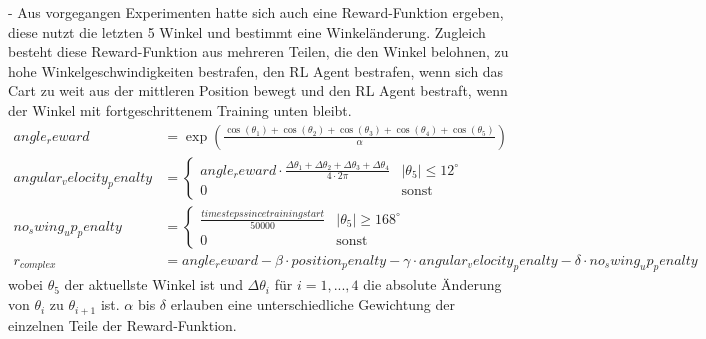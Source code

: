 - Aus vorgegangen Experimenten hatte sich auch eine Reward-Funktion ergeben, diese nutzt die letzten 5 Winkel und bestimmt eine Winkeländerung. Zugleich besteht diese Reward-Funktion aus mehreren Teilen, die den Winkel belohnen, zu hohe Winkelgeschwindigkeiten bestrafen, den RL Agent bestrafen, wenn sich das Cart zu weit aus der mittleren Position bewegt und den RL Agent bestraft, wenn der Winkel mit fortgeschrittenem Training unten bleibt. \begin{align}
    angle_reward &= \exp\left(\frac{\cos(\theta_1) + \cos(\theta_2) + \cos(\theta_3) + \cos(\theta_4) + \cos(\theta_5)}{\alpha}\right) \\
    angular_velocity_penalty &= \begin{cases}
        angle_reward\cdot\frac{\Delta\theta_1 + \Delta\theta_2 + \Delta\theta_3 + \Delta\theta_4}{4\cdot 2\pi} & \vert\theta_5\vert \le 12^\circ \\
        0 & \text{sonst}
    \end{cases} \\
    no_swing_up_penalty &= \begin{cases}
        \frac{time steps since training start}{50000} & \vert\theta_5\vert \ge 168^\circ \\
        0 & \text{sonst}
    \end{cases} \\
    r_{complex} &= angle_reward - \beta\cdot position_penalty - \gamma\cdot angular_velocity_penalty - \delta\cdot no_swing_up_penalty
\end{align}
wobei $\theta_5$ der aktuellste Winkel ist und $\Delta\theta_i$ für $i=1,...,4$ die absolute Änderung von $\theta_i$ zu $\theta_{i+1}$ ist. $\alpha$ bis $\delta$ erlauben eine unterschiedliche Gewichtung der einzelnen Teile der Reward-Funktion.